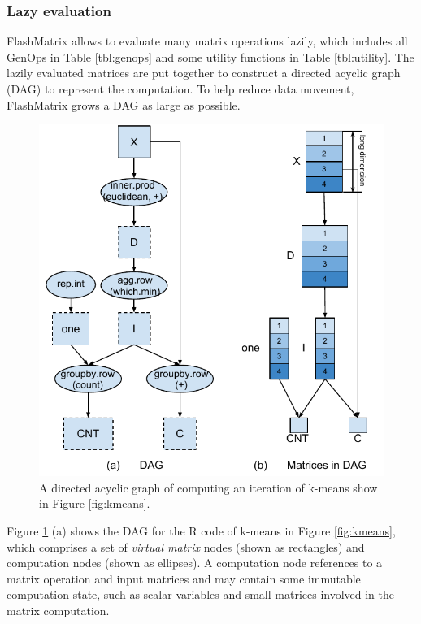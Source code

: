 \subsubsection{Lazy evaluation} \label{sec:lazy_eval}
FlashMatrix allows to evaluate many matrix operations lazily, which includes
all GenOps in Table \ref{tbl:genops} and some utility functions in Table
\ref{tbl:utility}. The lazily evaluated matrices are put together to construct
a directed acyclic graph (DAG) to represent the computation. To help reduce data
movement, FlashMatrix grows a DAG as large as possible.

\begin{figure}
	\centering
	\includegraphics[scale=0.6]{FlashMatrix_figs/KMeans.pdf}
	\caption{A directed acyclic graph of computing an iteration of k-means
	show in Figure \ref{fig:kmeans}.}
	\label{fig:DAG}
\end{figure}

Figure \ref{fig:DAG} (a) shows the DAG for the R code of k-means in Figure
\ref{fig:kmeans}, which comprises a set of \textit{virtual matrix} nodes
(shown as rectangles) and computation nodes (shown as ellipses).
A computation node references to a matrix operation and input matrices and
may contain some immutable computation state, such as scalar variables and
small matrices involved in the matrix computation. 


